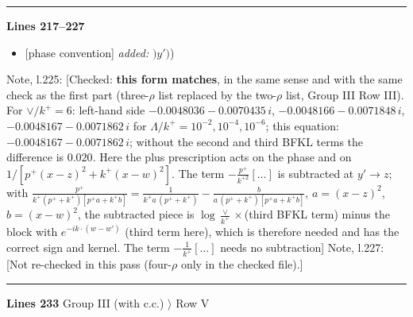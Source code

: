 \documentclass[10pt]{article}
\newenvironment{notebox}{\def\FrameCommand{{\color{notebar}\vrule width 1.5pt}\hspace{6pt}}\MakeFramed{\advance\hsize-\width\FrameRestore}\small}{\endMakeFramed}
\begin{document}
\par
{}\par
{}\par
{}\noindent\rule{\linewidth}{0.3pt}\par\noindent\textbf{Lines 217--227} \par
\begin{itemize}[leftmargin=2.2em,itemsep=1pt,topsep=2pt]
\item[\textbf{l.217}] \textsf{\small [phase convention]} \emph{added:} $\displaystyle )$$\displaystyle y')${\color{gray}\small)}
\end{itemize}
\begin{notebox}\textsf{\small Note, l.225:} [Checked: \textbf{this form matches}, in the same sense and with the same check as the first part (three-$\rho$ list replaced by the two-$\rho$ list, Group III Row III). For $\vee/k^{+}=6$: left-hand side $-0.0048036-0.0070435\,i$, $-0.0048166-0.0071848\,i$, $-0.0048167-0.0071862\,i$ for $\Lambda/k^{+}=10^{-2},10^{-4},10^{-6}$; this equation: $-0.0048167-0.0071862\,i$; without the second and third BFKL terms the difference is $0.020$. Here the plus prescription acts on the phase and on $1/[p^{+}(x-z)^{2}+k^{+}(x-w)^{2}]$. The term $-\frac{p^{+}}{k^{+2}}[\dots]$ is subtracted at $y'\to z$; with $\frac{p^{+}}{k^{+}(p^{+}+k^{+})[p^{+}a+k^{+}b]}=\frac{1}{k^{+}a\,(p^{+}+k^{+})}-\frac{b}{a\,(p^{+}+k^{+})[p^{+}a+k^{+}b]}$, $a=(x-z)^{2}$, $b=(x-w)^{2}$, the subtracted piece is $\log\frac{\vee}{k^{+}}\times$(third BFKL term) minus the block with $e^{-ik\cdot(w-w')}$ (third term here), which is therefore needed and has the correct sign and kernel. The term $-\frac{1}{k^{+}}[\dots]$ needs no subtraction]\end{notebox}
\begin{notebox}\textsf{\small Note, l.227:} [Not re-checked in this pass (four-$\rho$ only in the checked file).]\end{notebox}
\par
{}\noindent\rule{\linewidth}{0.3pt}\par\noindent\textbf{Lines 233} \quad \textsf{Group III (with c.c.) $\rangle$ Row V}\par
\end{document}
